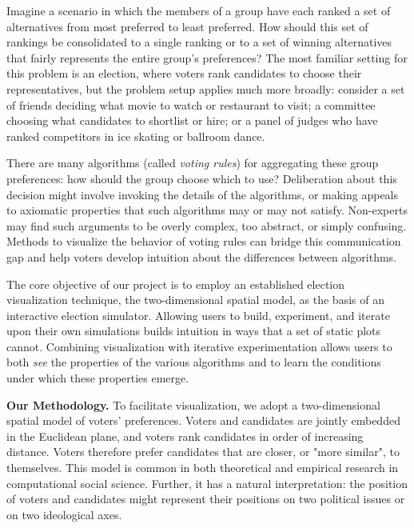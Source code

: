 
Imagine a scenario in which the members of a group have each ranked a set of alternatives
from most preferred to least preferred.
How should this set of rankings be consolidated to a single ranking
or to a set of winning alternatives that fairly represents the entire group's preferences?
The most familiar setting for this problem is an election,
where voters rank candidates to choose their representatives,
but the problem setup applies much more broadly:
consider
a set of friends deciding what movie to watch or restaurant to visit;
a committee choosing what candidates to shortlist or hire; or
a panel of judges who have ranked competitors in ice skating or ballroom dance.

There are many algorithms (called \textit{voting rules}) for aggregating these group preferences:
how should the group choose which to use?
Deliberation about this decision might involve invoking the details of the algorithms,
or making appeals to axiomatic properties that such algorithms may or may not satisfy.
Non-experts may find such arguments to be overly complex, too abstract, or simply confusing.
Methods to visualize the behavior of voting rules can bridge this communication gap
and help voters develop intuition about the differences between algorithms.

The core objective of our project is to employ an established election visualization technique,
the two-dimensional spatial model, as the basis of an interactive election simulator.
Allowing users to build, experiment, and iterate upon their own simulations
builds intuition in ways that a set of static plots cannot.
Combining visualization with iterative experimentation
allows users to both \textit{see} the properties of the various algorithms
and to learn the conditions under which these properties emerge.

\textbf{Our Methodology.}
To facilitate visualization, we adopt a two-dimensional spatial model of voters' preferences.
Voters and candidates are jointly embedded in the Euclidean plane,
and voters rank candidates in order of increasing distance.
Voters therefore prefer candidates that are closer, or "more similar", to themselves.
This model is common in both theoretical \cite{spatial}
and empirical \cite{guide} research in computational social science.
Further, it has a natural interpretation:
the position of voters and candidates might represent their
positions on two political issues or on two ideological axes.

